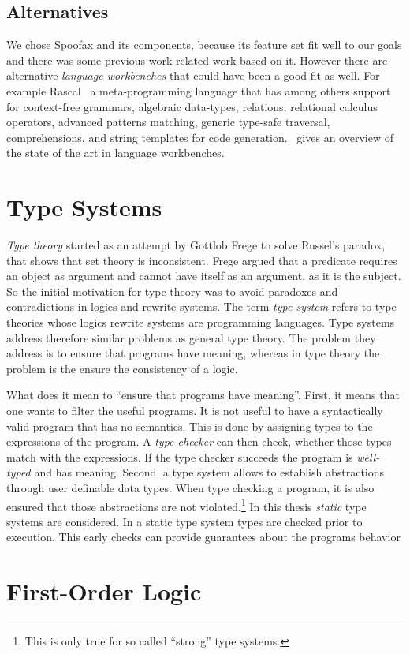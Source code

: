 \subsection{Alternatives}
We chose Spoofax and its components, because its feature set fit well
to our goals and there was some previous work related work based on
it. However there are alternative \textit{language workbenches} that
could have been a good fit as well. For example
Rascal~\cite{klint2009rascal} a meta-programming language that has
among others support for context-free grammars, algebraic data-types,
relations, relational calculus operators, advanced patterns matching,
generic type-safe traversal, comprehensions, and string templates for
code generation.~\cite{workbenches} gives an overview of the state of
the art in language workbenches.

\section{Type Systems}
\textit{Type theory} started as an attempt by Gottlob Frege to solve Russel's
paradox, that shows that \naive{} set theory is inconsistent. Frege
argued that a predicate requires an object as argument and cannot have
itself as an argument, as it is the subject. So the initial motivation for type theory was to avoid
paradoxes and contradictions in logics and rewrite systems. The term
\textit{type system} refers to type theories whose logics rewrite
systems are programming languages. Type systems address therefore
similar problems as general type theory. The problem they address is
to ensure that programs have meaning, whereas in type theory the
problem is the ensure the consistency of a logic.

What does it mean to ``ensure that programs have meaning''. First, it
means that one wants to filter the useful programs. It is not useful
to have a syntactically valid program that has no semantics. This is
done by assigning types to the expressions of the program. A
\textit{type checker} can then check, whether those types match with
the expressions. If the type checker succeeds the program is
\textit{well-typed} and has meaning. Second, a type system allows to
establish abstractions through user definable data types. When type
checking a program, it is also ensured that those abstractions are not
violated.\footnote{This is only true for so called ``strong'' type
  systems.} In this thesis \textit{static} type systems are
considered. In a static type system types are checked prior to
execution. This early checks can provide guarantees about the programs
behavior 
\section{First-Order Logic}

